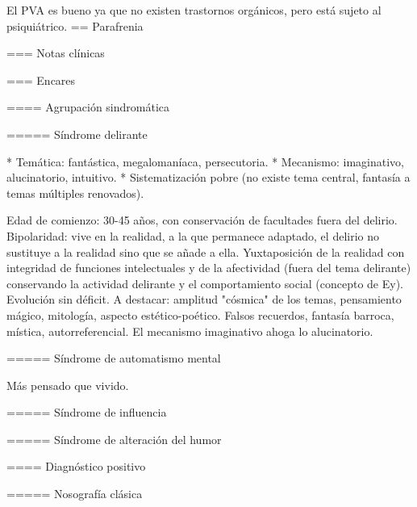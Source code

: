 \documentclass{scrbook}
\begin{document}
El PVA es bueno ya que no existen trastornos orgánicos, pero está sujeto al psiquiátrico.
== Parafrenia

=== Notas clínicas

=== Encares

==== Agrupación sindromática

===== Síndrome delirante

* Temática: fantástica, megalomaníaca, persecutoria.
* Mecanismo: imaginativo, alucinatorio, intuitivo.
* Sistematización pobre (no existe tema central, fantasía a temas múltiples renovados).

Edad de comienzo: 30-45 años, con conservación de facultades fuera del delirio. Bipolaridad: vive en la realidad, a la que permanece adaptado, el delirio no sustituye a la realidad sino que se añade a ella. Yuxtaposición de la realidad con integridad de funciones intelectuales y de la afectividad (fuera del tema delirante) conservando la actividad delirante y el comportamiento social (concepto de Ey). Evolución sin déficit. A destacar: amplitud "cósmica" de los temas, pensamiento mágico, mitología, aspecto estético-poético. Falsos recuerdos, fantasía barroca, mística, autorreferencial. El mecanismo imaginativo ahoga lo alucinatorio.

===== Síndrome de automatismo mental

Más pensado que vivido.

===== Síndrome de influencia

===== Síndrome de alteración del humor

==== Diagnóstico positivo

===== Nosografía clásica
\end{document}
